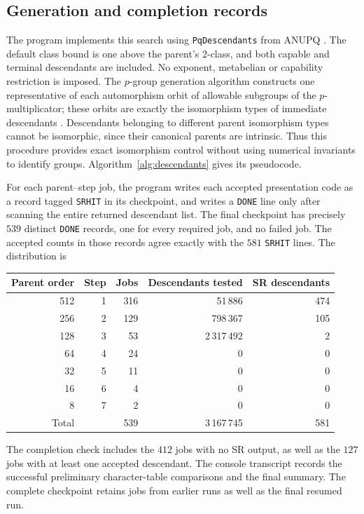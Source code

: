 \documentclass[11pt,a4paper]{amsart}
\theoremstyle{definition}
\theoremstyle{remark}
\numberwithin{equation}{section}
\begin{document}
\subsection{Generation and completion records}
The program  implements this search using
\texttt{PqDescendants} from ANUPQ \cite{ANUPQ}.
The default class bound is one above the parent's $2$-class, and
both capable and terminal descendants are included. No exponent,
metabelian or capability restriction is imposed. The
$p$-group generation algorithm constructs one representative of
each automorphism orbit of allowable subgroups of the
$p$-multiplicator; these orbits are exactly the isomorphism types
of immediate descendants \cite[Sections 2.1 and 2.3]{ANUPQ}.
Descendants belonging to different parent isomorphism types
cannot be isomorphic, since their canonical parents are intrinsic.
Thus this procedure provides exact isomorphism control without
using numerical invariants to identify groups.
Algorithm~\ref{alg:descendants} gives its pseudocode.

For each parent--step job, the program writes each accepted
presentation code as a record tagged \texttt{SRHIT} in its checkpoint,
and writes a
\texttt{DONE} line only after scanning the entire returned
descendant list. The final checkpoint
 has precisely $539$ distinct
\texttt{DONE} records, one for every required job, and no failed
job. The accepted counts in those records agree exactly with the
$581$ \texttt{SRHIT} lines. The distribution is
\begin{center}\small
\begin{tabular}{@{}rrrrr@{}}\toprule
Parent order&Step&Jobs&Descendants tested&SR descendants\\\midrule
512&1&316&51\,886&474\\
256&2&129&798\,367&105\\
128&3&53&2\,317\,492&2\\
64&4&24&0&0\\
32&5&11&0&0\\
16&6&4&0&0\\
8&7&2&0&0\\\midrule
Total&&539&3\,167\,745&581\\\bottomrule
\end{tabular}
\end{center}
The completion check includes the $412$ jobs with no SR output,
as well as the $127$ jobs with at least one accepted descendant.
The console transcript 
records the successful preliminary character-table comparisons
and the final summary. The complete checkpoint retains jobs from
earlier runs as well as the final resumed run.
\end{document}
